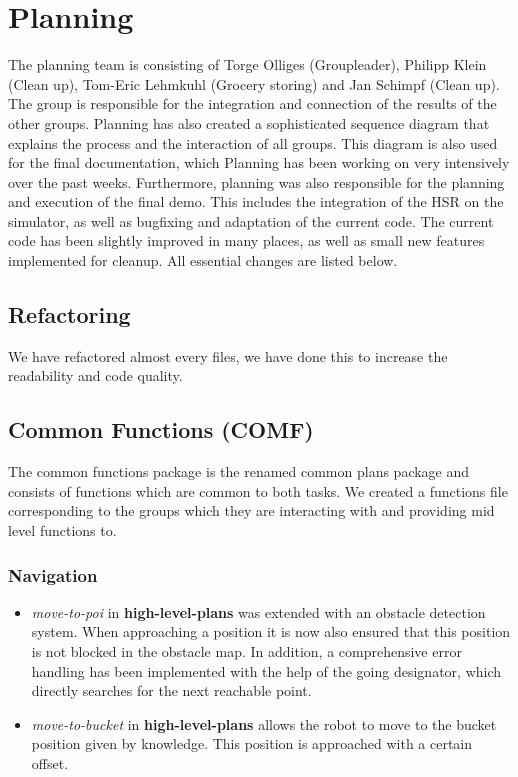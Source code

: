 \documentclass[main.tex]{subfiles}
\begin{document}
	
	\chapter{Planning}
                The planning team is consisting of Torge Olliges (Groupleader), Philipp Klein (Clean up), Tom-Eric Lehmkuhl (Grocery storing) and Jan Schimpf (Clean up). The group is responsible for the integration and connection of the results of the other groups. Planning has also created a sophisticated sequence diagram that explains the process and the interaction of all groups. This diagram is also used for the final documentation, which Planning has been working on very intensively over the past weeks. Furthermore, planning was also responsible for the planning and execution of the final demo. This includes the integration of the HSR on the simulator, as well as bugfixing and adaptation of the current code. The current code has been slightly improved in many places, as well as small new features implemented for cleanup. All essential changes are listed below. 
          
          		\section{Refactoring}
	        	    We have refactored almost every files, we have done this to increase the readability and code quality.   
                                           
                \section{Common Functions (COMF)}
	                The common functions package is the renamed common plans package and consists of functions which are common to both tasks. We created a functions file corresponding to the groups which they are interacting with and providing mid level functions to.
	               
                \subsection{Navigation}
                  \begin{itemize}
                    \item \textit{move-to-poi} in \textbf{high-level-plans} was extended with an obstacle detection system. When approaching a position it is now also ensured that this position is not blocked in the obstacle map. In addition, a comprehensive error handling has been implemented with the help of the going designator, which directly searches for the next reachable point.
                    
                     \item \textit{move-to-bucket} in \textbf{high-level-plans} allows the robot to move to the bucket position given by knowledge. This position is approached with a certain offset.
                  \end{itemize}
                
\end{document}
